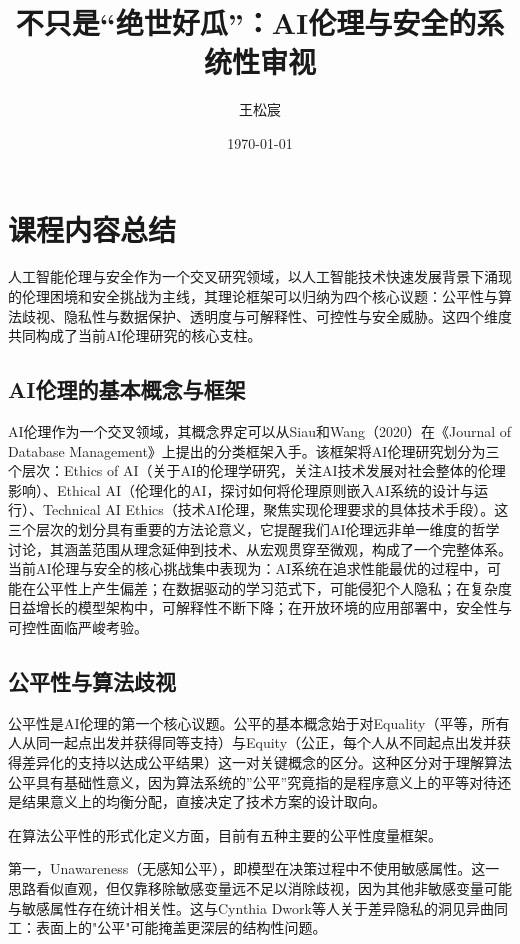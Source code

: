 \documentclass[12pt,a4paper]{ctexart}
\title{\textbf{不只是“绝世好瓜”：AI伦理与安全的系统性审视}}
\author{王松宸 \quad 2024201594}
\date{\today}
\begin{document}
\maketitle

\section{课程内容总结}

人工智能伦理与安全作为一个交叉研究领域，以人工智能技术快速发展背景下涌现的伦理困境和安全挑战为主线，其理论框架可以归纳为四个核心议题：公平性与算法歧视、隐私性与数据保护、透明度与可解释性、可控性与安全威胁。这四个维度共同构成了当前AI伦理研究的核心支柱。

\subsection{AI伦理的基本概念与框架}

AI伦理作为一个交叉领域，其概念界定可以从Siau和Wang（2020）在《Journal of Database Management》上提出的分类框架入手。该框架将AI伦理研究划分为三个层次：Ethics of AI（关于AI的伦理学研究，关注AI技术发展对社会整体的伦理影响）、Ethical AI（伦理化的AI，探讨如何将伦理原则嵌入AI系统的设计与运行）、Technical AI Ethics（技术AI伦理，聚焦实现伦理要求的具体技术手段）。这三个层次的划分具有重要的方法论意义，它提醒我们AI伦理远非单一维度的哲学讨论，其涵盖范围从理念延伸到技术、从宏观贯穿至微观，构成了一个完整体系。当前AI伦理与安全的核心挑战集中表现为：AI系统在追求性能最优的过程中，可能在公平性上产生偏差；在数据驱动的学习范式下，可能侵犯个人隐私；在复杂度日益增长的模型架构中，可解释性不断下降；在开放环境的应用部署中，安全性与可控性面临严峻考验。

\subsection{公平性与算法歧视}

公平性是AI伦理的第一个核心议题。公平的基本概念始于对Equality（平等，所有人从同一起点出发并获得同等支持）与Equity（公正，每个人从不同起点出发并获得差异化的支持以达成公平结果）这一对关键概念的区分。这种区分对于理解算法公平具有基础性意义，因为算法系统的”公平”究竟指的是程序意义上的平等对待还是结果意义上的均衡分配，直接决定了技术方案的设计取向。

在算法公平性的形式化定义方面，目前有五种主要的公平性度量框架。

第一，Unawareness（无感知公平），即模型在决策过程中不使用敏感属性。这一思路看似直观，但仅靠移除敏感变量远不足以消除歧视，因为其他非敏感变量可能与敏感属性存在统计相关性。这与Cynthia Dwork等人关于差异隐私的洞见异曲同工：表面上的"公平"可能掩盖更深层的结构性问题。
\end{document}
